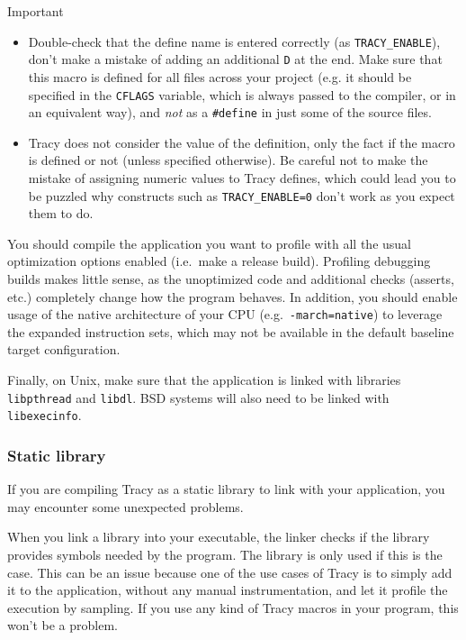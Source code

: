 \documentclass[hidelinks,titlepage,a4paper,twoside]{article}
\begin{document}
\begin{bclogo}[
noborder=true,
couleur=black!5,
logo=\bcbombe
]{Important}
\begin{itemize}
\item Double-check that the define name is entered correctly (as \texttt{TRACY\_ENABLE}), don't make a mistake of adding an additional \texttt{D} at the end. Make sure that this macro is defined for all files across your project (e.g. it should be specified in the \texttt{CFLAGS} variable, which is always passed to the compiler, or in an equivalent way), and \emph{not} as a \texttt{\#define} in just some of the source files.
\item Tracy does not consider the value of the definition, only the fact if the macro is defined or not (unless specified otherwise). Be careful not to make the mistake of assigning numeric values to Tracy defines, which could lead you to be puzzled why constructs such as \texttt{TRACY\_ENABLE=0} don't work as you expect them to do.
\end{itemize}
\end{bclogo}

You should compile the application you want to profile with all the usual optimization options enabled (i.e.~make a release build). Profiling debugging builds makes little sense, as the unoptimized code and additional checks (asserts, etc.) completely change how the program behaves. In addition, you should enable usage of the native architecture of your CPU (e.g.~\texttt{-march=native}) to leverage the expanded instruction sets, which may not be available in the default baseline target configuration.

Finally, on Unix, make sure that the application is linked with libraries \texttt{libpthread} and \texttt{libdl}. BSD systems will also need to be linked with \texttt{libexecinfo}.

\subsubsection{Static library}

If you are compiling Tracy as a static library to link with your application, you may encounter some unexpected problems.

When you link a library into your executable, the linker checks if the library provides symbols needed by the program. The library is only used if this is the case. This can be an issue because one of the use cases of Tracy is to simply add it to the application, without any manual instrumentation, and let it profile the execution by sampling. If you use any kind of Tracy macros in your program, this won't be a problem.
\end{document}
